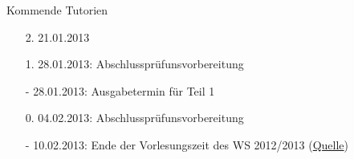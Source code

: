 \documentclass[usepdftitle=false,hyperref={pdfpagelabels=false}]{beamer}
\begin{document}
\begin{frame}{Kommende Tutorien}
  \begin{itemize}
    \item[2.] 21.01.2013
    \item[1.] 28.01.2013: Abschlussprüfunsvorbereitung
    \item[-] 28.01.2013: Ausgabetermin für Teil 1
    \item[0.] 04.02.2013: Abschlussprüfunsvorbereitung
    \item[-] 10.02.2013: Ende der Vorlesungszeit des WS 2012/2013 (\href{http://www.kit.edu/studieren/2873.php}{Quelle})
  \end{itemize}
\end{frame}

\end{document}
